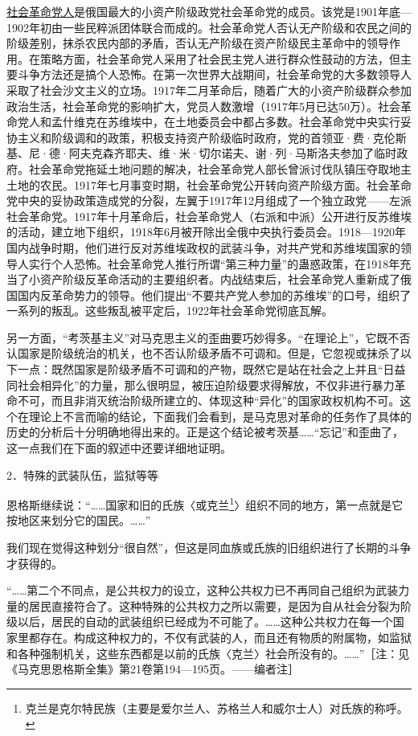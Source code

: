 \documentclass[UTF8, 12pt, a4paper]{ctexrep}
\begin{document}
{\fangsong \underline{社会革命党人}是俄国最大的小资产阶级政党社会革命党的成员。该党是1901年底—1902年初由一些民粹派团体联合而成的。社会革命党人否认无产阶级和农民之间的阶级差别，抹杀农民内部的矛盾，否认无产阶级在资产阶级民主革命中的领导作用。在策略方面，社会革命党人采用了社会民主党人进行群众性鼓动的方法，但主要斗争方法还是搞个人恐怖。在第一次世界大战期间，社会革命党的大多数领导人采取了社会沙文主义的立场。1917年二月革命后，随着广大的小资产阶级群众参加政治生活，社会革命党的影响扩大，党员人数激增（1917年5月已达50万）。社会革命党人和孟什维克在苏维埃中，在土地委员会中都占多数。社会革命党中央实行妥协主义和阶级调和的政策，积极支持资产阶级临时政府，党的首领亚·费·克伦斯基、尼·德·阿夫克森齐耶夫、维·米·切尔诺夫、谢·列·马斯洛夫参加了临时政府。社会革命党拖延土地问题的解决，社会革命党人部长曾派讨伐队镇压夺取地主土地的农民。1917年七月事变时期，社会革命党公开转向资产阶级方面。社会革命党中央的妥协政策造成党的分裂，左翼于1917年12月组成了一个独立政党——左派社会革命党。1917年十月革命后，社会革命党人（右派和中派）公开进行反苏维埃的活动，建立地下组织，1918年6月被开除出全俄中央执行委员会。1918—1920年国内战争时期，他们进行反对苏维埃政权的武装斗争，对共产党和苏维埃国家的领导人实行个人恐怖。社会革命党人推行所谓“第三种力量”的蛊惑政策，在1918年充当了小资产阶级反革命活动的主要组织者。内战结束后，社会革命党人重新成了俄国国内反革命势力的领导。他们提出“不要共产党人参加的苏维埃”的口号，组织了一系列的叛乱。这些叛乱被平定后，1922年社会革命党彻底瓦解。}

另一方面，“考茨基主义”对马克思主义的歪曲要巧妙得多。“在理论上”，它既不否认国家是阶级统治的机关，也不否认阶级矛盾不可调和。但是，它忽视或抹杀了以下一点：既然国家是阶级矛盾不可调和的产物，既然它是站在社会之上并且“日益同社会相异化”的力量，那么很明显，被压迫阶级要求得解放，不仅非进行暴力革命不可，而且非消灭统治阶级所建立的、体现这种“异化”的国家政权机构不可。这个在理论上不言而喻的结论，下面我们会看到，是马克思对革命的任务作了具体的历史的分析后十分明确地得出来的。正是这个结论被考茨基……“忘记”和歪曲了，这一点我们在下面的叙述中还要详细地证明。

2．特殊的武装队伍，监狱等等

恩格斯继续说：“……国家和旧的氏族〈或克兰\footnote{克兰是克尔特民族（主要是爱尔兰人、苏格兰人和威尔士人）对氏族的称呼。}〉组织不同的地方，第一点就是它按地区来划分它的国民。……”

我们现在觉得这种划分“很自然”，但这是同血族或氏族的旧组织进行了长期的斗争才获得的。

“……第二个不同点，是公共权力的设立，这种公共权力已不再同自己组织为武装力量的居民直接符合了。这种特殊的公共权力之所以需要，是因为自从社会分裂为阶级以后，居民的自动的武装组织已经成为不可能了。……这种公共权力在每一个国家里都存在。构成这种权力的，不仅有武装的人，而且还有物质的附属物，如监狱和各种强制机关，这些东西都是以前的氏族〈克兰〉社会所没有的。……”［注：见《马克思恩格斯全集》第21卷第194—195页。——编者注］
\end{document}
